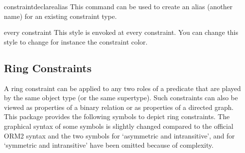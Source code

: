\documentclass[a4paper,10pt]{article}
\begin{document}
\begin{command}{constraintdeclarealias}
  This command can be used to create an alias (another name) for an existing constraint type.
\end{command}

\begin{stylekey}{every constraint}
  This style is envoked at every constraint. You can change this style to change for instance the constraint color.
\end{stylekey}


\subsection{Ring Constraints}
\label{sec:ringconstraints}

A ring constraint can be applied to any two roles of a predicate that are played by the same object type (or the same supertype). Such constraints can also be viewed as properties of a binary relation or as properties of a directed graph. This package provides the following symbols to depict ring constraints. The graphical syntax of some symbols is slightly changed compared to the official ORM2 syntax and the two symbols for `asymmetric and intransitive', and for `symmetric and intransitive' have been omitted because of complexity.

\begin{codeexample}[]
\centering
{}
\end{codeexample}

\begin{codeexample}[width=2.5cm]
\end{codeexample}
\end{document}
